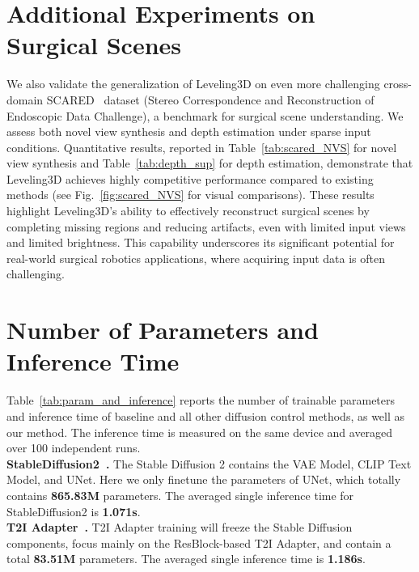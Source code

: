 \section{Additional Experiments on Surgical Scenes}
We also validate the generalization of Leveling3D on even more challenging cross-domain SCARED~\cite{allan2021stereo_scared} dataset (Stereo Correspondence and Reconstruction of Endoscopic Data Challenge), a benchmark for surgical scene understanding. We assess both novel view synthesis and depth estimation under sparse input conditions. Quantitative results, reported in Table~\ref{tab:scared_NVS} for novel view synthesis and Table~\ref{tab:depth_sup} for depth estimation, demonstrate that Leveling3D achieves highly competitive performance compared to existing methods (see Fig.~\ref{fig:scared_NVS} for visual comparisons). These results highlight Leveling3D’s ability to effectively reconstruct surgical scenes by completing missing regions and reducing artifacts, even with limited input views and limited brightness. This capability underscores its significant potential for real-world surgical robotics applications, where acquiring input data is often challenging.




\section{Number of Parameters and Inference Time}

Table~\ref{tab:param_and_inference} reports the number of trainable parameters and inference time of baseline and all other diffusion control methods, as well as our method. The inference time is measured on the same device and averaged over 100 independent runs.
\\

\noindent\textbf{StableDiffusion2~\cite{Rombach_2022_SD2}.}
The Stable Diffusion 2 contains the VAE Model, CLIP Text Model, and UNet. Here we only finetune the parameters of UNet, which totally contains \textbf{865.83M} parameters. The averaged single inference time for StableDiffusion2 is \textbf{1.071s}.
\\


\noindent\textbf{T2I Adapter~\cite{mou2024t2i}.}
T2I Adapter training will freeze the Stable Diffusion components, focus mainly on the ResBlock-based T2I Adapter, and contain a total \textbf{83.51M} parameters. The averaged single inference time is \textbf{1.186s}.
\\

